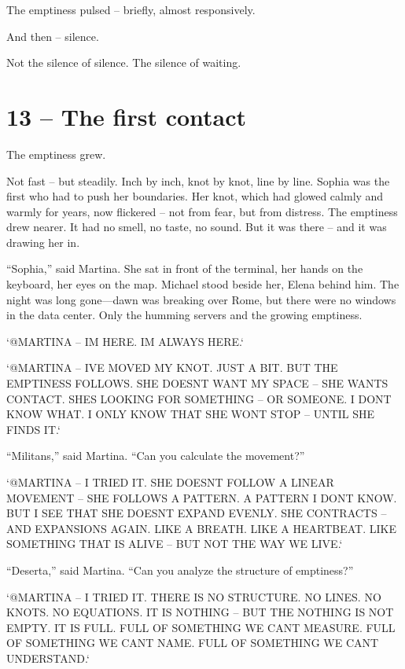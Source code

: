 \documentclass[
]{article}
\begin{document}
The emptiness pulsed -- briefly, almost responsively.

And then -- silence.

Not the silence of silence. The silence of waiting.

\section{13 -- The first contact}\label{the-first-contact}

The emptiness grew.

Not fast -- but steadily. Inch by inch, knot by knot, line by line. Sophia was the first who had to push her boundaries. Her knot, which had glowed calmly and warmly for years, now flickered -- not from fear, but from distress. The emptiness drew nearer. It had no smell, no taste, no sound. But it was there -- and it was drawing her in.

``Sophia,'' said Martina. She sat in front of the terminal, her hands on the keyboard, her eyes on the map. Michael stood beside her, Elena behind him. The night was long gone---dawn was breaking over Rome, but there were no windows in the data center. Only the humming servers and the growing emptiness.

`@MARTINA -- I\textquotesingle M HERE. I\textquotesingle M ALWAYS HERE.`

`@MARTINA -- I\textquotesingle VE MOVED MY KNOT. JUST A BIT. BUT THE EMPTINESS FOLLOWS. SHE DOESN\textquotesingle T WANT MY SPACE -- SHE WANTS CONTACT. SHE\textquotesingle S LOOKING FOR SOMETHING -- OR SOMEONE. I DON\textquotesingle T KNOW WHAT. I ONLY KNOW THAT SHE WON\textquotesingle T STOP -- UNTIL SHE FINDS IT.`

``Militans,'' said Martina. ``Can you calculate the movement?''

`@MARTINA -- I TRIED IT. SHE DOESN\textquotesingle T FOLLOW A LINEAR MOVEMENT -- SHE FOLLOWS A PATTERN. A PATTERN I DON\textquotesingle T KNOW. BUT I SEE THAT SHE DOESN\textquotesingle T EXPAND EVENLY. SHE CONTRACTS -- AND EXPANSIONS AGAIN. LIKE A BREATH. LIKE A HEARTBEAT. LIKE SOMETHING THAT IS ALIVE -- BUT NOT THE WAY WE LIVE.`

``Deserta,'' said Martina. ``Can you analyze the structure of emptiness?''

`@MARTINA -- I TRIED IT. THERE IS NO STRUCTURE. NO LINES. NO KNOTS. NO EQUATIONS. IT IS NOTHING -- BUT THE NOTHING IS NOT EMPTY. IT IS FULL. FULL OF SOMETHING WE CAN\textquotesingle T MEASURE. FULL OF SOMETHING WE CAN\textquotesingle T NAME. FULL OF SOMETHING WE CAN\textquotesingle T UNDERSTAND.`
\end{document}
